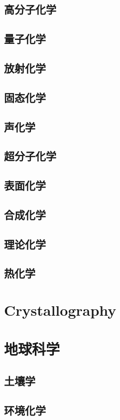 \documentclass[UTF8]{NatureUniverse}
\begin{document}
\section{高分子化学}
\section{量子化学}
\section{放射化学}
\section{固态化学}
\section{声化学}
\section{超分子化学}
\section{表面化学}
\section{合成化学}
\section{理论化学}
\section{热化学}



\chapter{Crystallography}    %




\chapter{地球科学}    %
\section{土壤学}
\section{环境化学}
\end{document}
